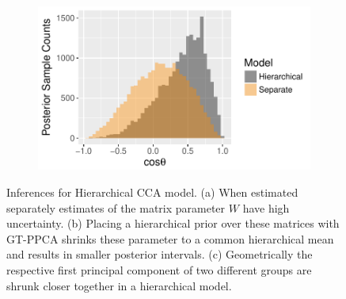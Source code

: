 \documentclass{article}
\begin{document}
\begin{figure}
\begin{subfigure}[b]{0.22\textwidth}
        \caption{}
        \label{fig:hierPosteriors}
    \end{subfigure}
    \quad %
    \begin{subfigure}[b]{0.37\textwidth}
        \includegraphics[width=\textwidth]{posteriorCosAngle.pdf}
        \caption{}
        \label{fig:posteriorCosAngle}
    \end{subfigure}
    \caption{Inferences for Hierarchical CCA model. (a) When estimated separately estimates of the matrix parameter $W$ have high uncertainty. (b) Placing a hierarchical prior over these matrices with GT-PPCA shrinks these parameter to a common hierarchical mean and results in smaller posterior intervals. (c) Geometrically the respective first principal component of two different groups are shrunk closer together in a hierarchical model.}\label{fig:ccaResults}
\end{figure}

\end{document}
